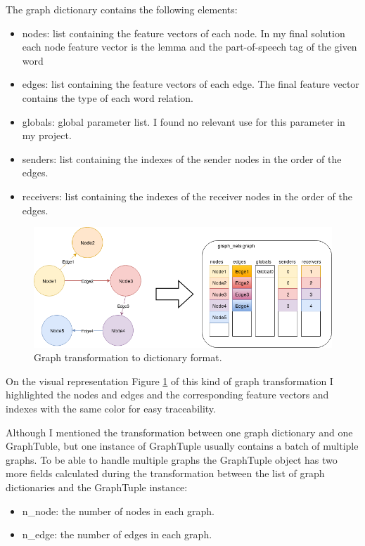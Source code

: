 The graph dictionary contains the following elements:
\begin{itemize}
	\item nodes: list containing the feature vectors of each node. In my final solution each node feature vector is the lemma and the part-of-speech tag of the given word 
	\item edges: list containing the feature vectors of each edge. The final feature vector contains the type of each word relation.
	\item globals: global parameter list. I found no relevant use for this parameter in my project.
	\item senders: list containing the indexes of the sender nodes in the order of the edges.
	\item receivers: list containing the indexes of the receiver nodes in the order of the edges.
\end{itemize}

\begin{figure}[!ht]
	\centering
	\includegraphics[width=150mm, keepaspectratio]{figures/transform_color.png}
	\caption{Graph transformation to dictionary format.}
	\label{fig:transform_graph}
\end{figure}

On the visual representation Figure \ref{fig:transform_graph} of this kind of graph transformation I highlighted the nodes and edges and the corresponding feature vectors and indexes with the same color for easy traceability.

Although I mentioned the transformation between one graph dictionary and one GraphTuble, but one instance of GraphTuple usually contains a batch of multiple graphs. To be able to handle multiple graphs the GraphTuple object has two more fields calculated during the transformation between the list of graph dictionaries and the GraphTuple instance:
\begin{itemize}
	\item n\_node: the number of nodes in each graph.
	\item n\_edge: the number of edges in each graph.
\end{itemize}

